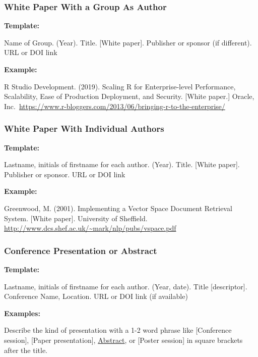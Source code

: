 \documentclass[
]{book}
\begin{document}
\hypertarget{white-paper-with-a-group-as-author}{%
\subsubsection{White Paper With a Group As Author}\label{white-paper-with-a-group-as-author}}

\textbf{Template:}

Name of Group. (Year). Title. {[}White paper{]}. Publisher or sponsor (if different). URL or DOI link

\textbf{Example:}

R Studio Development. (2019). Scaling R for Enterprise-level Performance, Scalability, Ease of Production Deployment, and Security. {[}White paper.{]} Oracle, Inc.~\url{https://www.r-bloggers.com/2013/06/bringing-r-to-the-enterprise/}

\hypertarget{white-paper-with-individual-authors}{%
\subsubsection{White Paper With Individual Authors}\label{white-paper-with-individual-authors}}

\textbf{Template:}

Lastname, initials of firstname for each author. (Year). Title. {[}White paper{]}. Publisher or sponsor. URL or DOI link

\textbf{Example:}

Greenwood, M. (2001). Implementing a Vector Space Document Retrieval System. {[}White paper{]}. University of Sheffield. \url{http://www.dcs.shef.ac.uk/~mark/nlp/pubs/vspace.pdf}

\hypertarget{conference-presentation-or-abstract}{%
\subsubsection{Conference Presentation or Abstract}\label{conference-presentation-or-abstract}}

\textbf{Template:}

Lastname, initials of firstname for each author. (Year, date). Title {[}descriptor{]}. Conference Name, Location. URL or DOI link (if available)

\textbf{Examples:}

Describe the kind of presentation with a 1-2 word phrase like {[}Conference session{]}, {[}Paper presentation{]}, \protect\hyperlink{abstract}{Abstract}, or {[}Poster session{]} in square brackets after the title.
\end{document}
